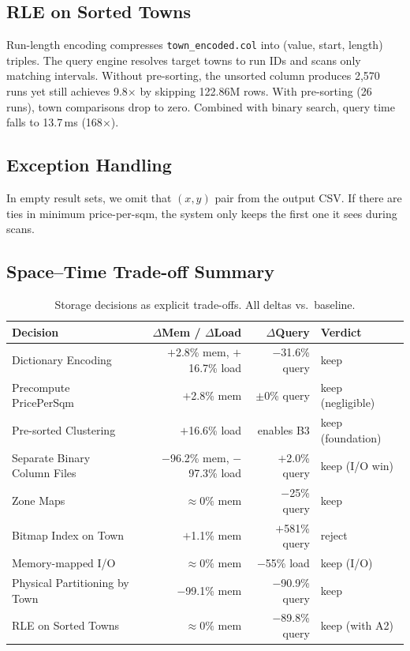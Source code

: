 \documentclass[11pt,a4paper]{article}
\begin{document}
\subsection{RLE on Sorted Towns}\label{sec:rle}
Run-length encoding compresses \texttt{town\_encoded.col} into (value, start, length) triples.
The query engine resolves target towns to run IDs and scans only matching intervals.
Without pre-sorting, the unsorted column produces 2,570 runs yet still achieves 9.8$\times$ by skipping 122.86M rows.
With pre-sorting (26 runs), town comparisons drop to zero.
Combined with binary search, query time falls to 13.7\,ms (168$\times$).

\subsection{Exception Handling}\label{sec:except}
In empty result sets, we omit that $(x,y)$ pair from the output CSV.
If there are ties in minimum price-per-sqm, the system only keeps the first one it sees during scans.

\subsection{Space--Time Trade-off Summary}\label{sec:tradeoff-summary}

\begin{table}[H]\centering\footnotesize
\setlength{\tabcolsep}{3pt}
\begin{tabular}{@{}lrrl@{}}
\toprule
Decision & $\Delta$Mem / $\Delta$Load & $\Delta$Query & Verdict \\
\midrule
Dictionary Encoding       & $+$2.8\% mem, $+$16.7\% load & $-$31.6\% query   & keep \\
Precompute PricePerSqm  & $+$2.8\% mem               & $\pm$0\% query  & keep (negligible) \\
Pre-sorted Clustering    & $+$16.6\% load             & enables B3      & keep (foundation) \\
Separate Binary Column Files         & $-$96.2\% mem, $-$97.3\% load & $+$2.0\% query & keep (I/O win) \\
Zone Maps              &  $\approx 0\%$ mem                  & $-$25\% query   & keep \\
Bitmap Index on Town      & $+$1.1\% mem                & $+$581\% query & reject \\
Memory-mapped I/O               & $\approx 0\%$ mem                  & $-$55\% load    & keep (I/O) \\
Physical Partitioning by Town      & $-$99.1\% mem               & $-$90.9\% query & keep \\
RLE on Sorted Towns        &  $\approx 0\%$ mem                & $-$89.8\% query & keep (with A2) \\
\bottomrule
\end{tabular}
\caption{Storage decisions as explicit trade-offs. All deltas vs.\ baseline.}\label{tab:tradeoff}
\end{table}
\end{document}
